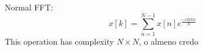 Normal FFT: 
\[
x\left[k\right]=\sum_{n=1}^{N-1}x[n]e^\frac{-i2\pi kn}{N}
\]
This operation has complexity $N\times N$, o almeno credo
